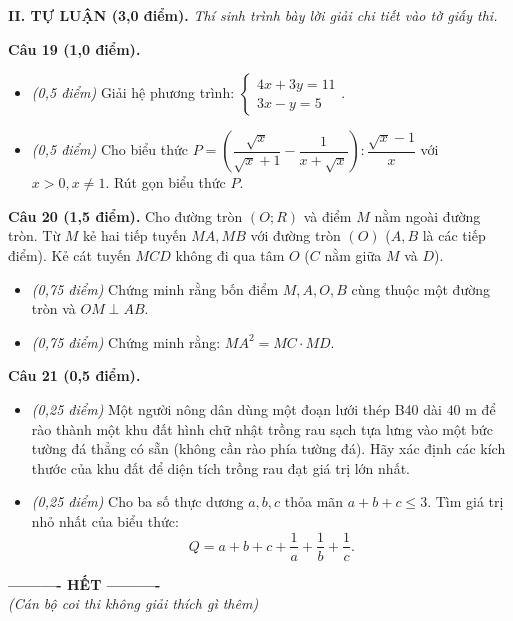 \documentclass[11pt,a4paper]{article}
\begin{document}
\vspace{4mm}
\noindent
\textbf{\large II. TỰ LUẬN (3,0 điểm).} \textit{Thí sinh trình bày lời giải chi tiết vào tờ giấy thi.}

\vspace{2mm}
\textbf{Câu 19 (1,0 điểm).}
\begin{itemize}
  \item[a)] \textit{(0,5 điểm)} Giải hệ phương trình: $\begin{cases} 4x + 3y = 11 \\ 3x - y = 5 \end{cases}$.
  \item[b)] \textit{(0,5 điểm)} Cho biểu thức $P = \left( \dfrac{\sqrt{x}}{\sqrt{x}+1} - \dfrac{1}{x+\sqrt{x}} \right) : \dfrac{\sqrt{x}-1}{x}$ với $x > 0, x \ne 1$. Rút gọn biểu thức $P$.
\end{itemize}

\vspace{2mm}
\textbf{Câu 20 (1,5 điểm).} Cho đường tròn $(O; R)$ và điểm $M$ nằm ngoài đường tròn. Từ $M$ kẻ hai tiếp tuyến $MA, MB$ với đường tròn $(O)$ ($A, B$ là các tiếp điểm). Kẻ cát tuyến $MCD$ không đi qua tâm $O$ ($C$ nằm giữa $M$ và $D$).
\begin{itemize}
  \item[a)] \textit{(0,75 điểm)} Chứng minh rằng bốn điểm $M, A, O, B$ cùng thuộc một đường tròn và $OM \perp AB$.
  \item[b)] \textit{(0,75 điểm)} Chứng minh rằng: $MA^2 = MC \cdot MD$.
\end{itemize}

\vspace{2mm}
\textbf{Câu 21 (0,5 điểm).}
\begin{itemize}
  \item[a)] \textit{(0,25 điểm)} Một người nông dân dùng một đoạn lưới thép B40 dài $40\text{ m}$ để rào thành một khu đất hình chữ nhật trồng rau sạch tựa lưng vào một bức tường đá thẳng có sẵn (không cần rào phía tường đá). Hãy xác định các kích thước của khu đất để diện tích trồng rau đạt giá trị lớn nhất.
  \item[b)] \textit{(0,25 điểm)} Cho ba số thực dương $a, b, c$ thỏa mãn $a + b + c \le 3$. Tìm giá trị nhỏ nhất của biểu thức:
  \[
  Q = a + b + c + \dfrac{1}{a} + \dfrac{1}{b} + \dfrac{1}{c}.
  \]
\end{itemize}

\vspace{4mm}
\begin{center}
\textbf{---------- HẾT ----------}\\
\textit{(Cán bộ coi thi không giải thích gì thêm)}
\end{center}
\end{document}
